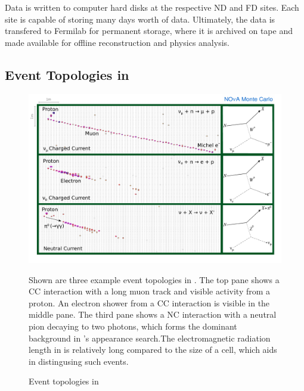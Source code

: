 Data is written to computer hard disks at the respective ND and FD sites.  Each site is capable of storing many days worth of data.  Ultimately, the data is transfered to Fermilab for permanent storage, where it is archived on tape and made available for offline reconstruction and physics analysis.


\subsection{Event Topologies in \nova}

\begin{figure}
\begin{center}
\includegraphics[width=\textwidth]{figures/figures/event_topology_nue.pdf}
\end{center}
\caption{Event topologies in \nova}{Shown are three example event topologies in
\nova.  The top pane shows a \numu CC interaction with a long muon track and
visible activity from a proton.  An electron shower from a \nue CC interaction
is visible in the middle pane.  The third pane shows a NC interaction
with a neutral pion decaying to two photons, which forms the dominant
background in \nova's \nue appearance search.The electromagnetic
radiation length in \nova is relatively long compared to the size of a cell,
which aids in distingusing such events.}
\label{eventtopnue}
\end{figure}


